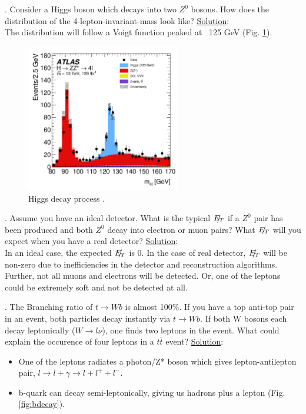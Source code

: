 \documentclass[a4paper]{report}
\numberwithin{equation}{section}
\begin{document}
\bigbreak

. Consider a Higgs boson which decays into two $Z^0$ bosons. How does the distribution of the 4-lepton-invariant-mass look like?
\bigbreak
\noindent \underline{Solution}: \\
\noindent The distribution will follow a Voigt function peaked at ~125 GeV (Fig. \ref{fig:higgs-decay}).

\begin{figure}[htpb]
    \centering
    \includegraphics[width=0.6\textwidth]{higgs-decay}
    \caption{Higgs decay process \cite{ATLAS:2020wny}.}
    \label{fig:higgs-decay}
\end{figure}

\bigbreak

. Assume you have an ideal detector. What is the typical $\slashed{E_T}$ if a $Z^0$ pair has been produced and both $Z^0$ decay into electron or muon pairs? What $\slashed{E_T}$ will you expect when you have a real detector?
\bigbreak
\noindent \underline{Solution}: \\
\noindent In an ideal case, the expected $\slashed{E_T}$ is 0. In the case of real detector, $\slashed{E_T}$ will be non-zero due to inefficiencies in the detector and reconstruction algorithms. Further, not all muons and electrons will be detected. Or, one of the leptons could be extremely soft and not be detected at all. 

\bigbreak

. The Branching ratio of $t \rightarrow W b$ is almost 100\%. If you have a top anti-top pair in an event, both particles decay instantly via $t \rightarrow W b$. If both W bosons each decay leptonically ($W \rightarrow l \nu$), one finds two leptons in the event. What could explain the occurence of four leptons in a $t \bar{t}$ event?
\bigbreak
\noindent \underline{Solution}: \\
\begin{itemize}
	\item One of the leptons radiates a photon/Z* boson which gives lepton-antilepton pair, $l \rightarrow l + \gamma \rightarrow l + l^+ + l^-$.
	\item b-quark can decay semi-leptonically, giving us hadrons plus a lepton (Fig. \ref{fig:bdecay}).
\end{itemize}
\end{document}
